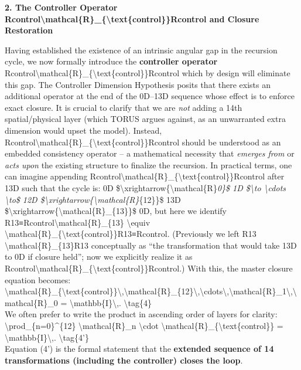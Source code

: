 \documentclass[
]{article}
\begin{document}
\textbf{2. The Controller Operator
Rcontrol\textbackslash mathcal\{R\}\_\{\textbackslash text\{control\}\}Rcontrol\hspace{0pt}
and Closure Restoration}

Having established the existence of an intrinsic angular gap in the
recursion cycle, we now formally introduce the \textbf{controller
operator}
Rcontrol\textbackslash mathcal\{R\}\_\{\textbackslash text\{control\}\}Rcontrol\hspace{0pt}
which by design will eliminate this gap. The Controller Dimension
Hypothesis posits that there exists an additional operator at the end of
the 0D--13D sequence whose effect is to enforce exact closure. It is
crucial to clarify that we are \emph{not} adding a 14th spatial/physical
layer (which TORUS argues against, as an unwarranted extra dimension
would upset the model\hspace{0pt}). Instead,
Rcontrol\textbackslash mathcal\{R\}\_\{\textbackslash text\{control\}\}Rcontrol\hspace{0pt}
should be understood as an embedded consistency operator -- a
mathematical necessity that \emph{emerges from} or \emph{acts upon} the
existing structure to finalize the recursion. In practical terms, one
can imagine appending
Rcontrol\textbackslash mathcal\{R\}\_\{\textbackslash text\{control\}\}Rcontrol\hspace{0pt}
after 13D such that the cycle is: 0D
\$\textbackslash xrightarrow\{\textbackslash mathcal\{R\}\emph{0\}\$ 1D
\$\textbackslash to \textbackslash cdots \textbackslash to\$ 12D
\$\textbackslash xrightarrow\{\textbackslash mathcal\{R\}}\{12\}\}\$ 13D
\$\textbackslash xrightarrow\{\textbackslash mathcal\{R\}\_\{13\}\}\$
0D, but here we identify R13≡Rcontrol\textbackslash mathcal\{R\}\_\{13\}
\textbackslash equiv
\textbackslash mathcal\{R\}\_\{\textbackslash text\{control\}\}R13\hspace{0pt}≡Rcontrol\hspace{0pt}.
(Previously we left R13
\textbackslash mathcal\{R\}\_\{13\}R13\hspace{0pt} conceptually as ``the
transformation that would take 13D to 0D if closure held''; now we
explicitly realize it as
Rcontrol\textbackslash mathcal\{R\}\_\{\textbackslash text\{control\}\}Rcontrol\hspace{0pt}.)
With this, the master closure equation becomes:\\
\textbackslash mathcal\{R\}\_\{\textbackslash text\{control\}\}\textbackslash,\textbackslash mathcal\{R\}\_\{12\}\textbackslash,\textbackslash cdots\textbackslash,\textbackslash mathcal\{R\}\_1\textbackslash,\textbackslash mathcal\{R\}\_0
= \textbackslash mathbb\{I\}\textbackslash,. \textbackslash tag\{4\}\\
We often prefer to write the product in ascending order of layers for
clarity:\\
\textbackslash prod\_\{n=0\}\^{}\{12\} \textbackslash mathcal\{R\}\_n
\textbackslash cdot
\textbackslash mathcal\{R\}\_\{\textbackslash text\{control\}\} =
\textbackslash mathbb\{I\}\textbackslash,. \textbackslash tag\{4'\}\\
Equation (4') is the formal statement that the \textbf{extended sequence
of 14 transformations (including the controller) closes the loop}.
\end{document}
